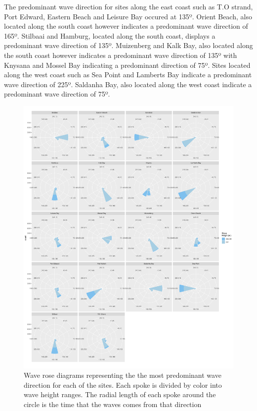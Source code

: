 \documentclass[12pt,a4paper,]{article}
\begin{document}
The predominant wave direction for sites along the east coast such as
T.O strand, Port Edward, Eastern Beach and Leisure Bay occured at 135º.
Orient Beach, also located along the south coast however indicates a
predominant wave direction of 165º. Stilbaai and Hamburg, located along
the south coast, displays a predominant wave direction of 135º.
Muizenberg and Kalk Bay, also located along the south coast however
indicates a predominant wave direction of 135º with Knysana and Mossel
Bay indicating a predominant direction of 75º. Sites located along the
west coast such as Sea Point and Lamberts Bay indicate a predominant
wave direction of 225º. Saldanha Bay, also located along the west coast
indicate a predominant wave direction of 75º.

\begin{figure}
\centering
\includegraphics{../figures/p.wave.pdf}
\caption{Wave rose diagrams representing the the most predominant wave
direction for each of the sites. Each spoke is divided by color into
wave height ranges. The radial length of each spoke around the circle is
the time that the waves comes from that direction}
\end{figure}
\end{document}
